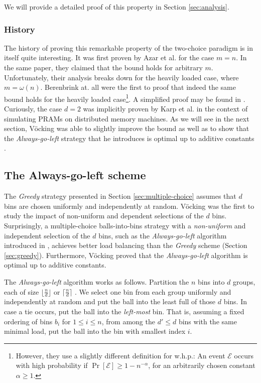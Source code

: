\documentclass[a4paper,12pt]{article}
\begin{document}
We will provide a detailed proof of this property in Section \ref{sec:analysis}.

\subsubsection{History}
\label{sec:historyOfGreedy}
The history of proving this remarkable property of the two-choice paradigm is in itself quite interesting. It was first proven by Azar et al. \cite{ABKU99} for the case $m = n$. In the same paper, they claimed that the bound holds for arbitrary $m$. Unfortunately, their analysis breaks down for the heavily loaded case, where $m = \omega\left(n\right)$. Berenbrink at. all \cite{BFZR08} were the first to proof that indeed the same bound holds for the heavily loaded case\footnote{However, they use a slightly different definition for w.h.p.: An event $\mathcal E$ occurs with high probability if $\Pr\left[\mathcal E \right]  \geq 1- n^{-\alpha}$, for an arbitrarily chosen constant $\alpha \geq 1$.}. A simplified proof may be found in \cite{TW13}. Curiously, the case $d = 2$ was implicitly proven by Karp et al. in the context of simulating PRAMs on distributed memory machines\cite{KLM92}. As we will see in the next section, V\"ocking was able to slightly improve the bound as well as to show that the \emph{Always-go-left} strategy that he introduces is optimal up to additive constants \cite{VOC03}.


\subsection{The Always-go-left scheme}
\label{sec:AlwaysGoLeft}
The \emph{Greedy} strategy presented in Section \ref{sec:multiple-choice} assumes that $d$ bins are chosen uniformly and independently at random. V\"ocking \cite{VOC03} was the first to study the impact of non-uniform and dependent selections of the $d$ bins. Surprisingly, a multiple-choice balls-into-bins strategy with a \emph{non-uniform} and independent selection of the $d$ bins, such as the \emph{Always-go-left} algorithm introduced in \cite{VOC03}, achieves better\cite{BCSV06} load balancing than the \emph{Greedy} scheme (Section \ref{sec:greedy}). Furthermore, V\"ocking proved that the \emph{Always-go-left} algorithm is optimal up to additive constants.

The \emph{Always-go-left} algorithm works as follows. Partition the $n$ bins into $d$ groups, each of size $\lfloor \frac{n}{d}\rfloor$ or $\lceil\frac{n}{d}\rceil$ . We select one bin from each group uniformly and independently at random and put the ball into the least full of those $d$ bins. In case a tie occurs, put the ball into the \emph{left-most} bin. That is, assuming a fixed ordering of bins $b_i$ for $1 \leq i \leq n$, from among the $d' \leq d$ bins with the same minimal load, put the ball into the bin with smallest index $i$.
\end{document}
